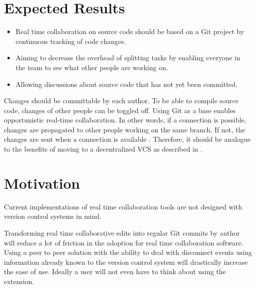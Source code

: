 \section{Expected Results}

\begin{itemize}
    \item Real time collaboration on source code should be based on a Git project by
    continuous tracking of code changes.
    \item Aiming to decrease the overhead of splitting tasks by enabling everyone in the team to see what other people are working on. 
    \item Allowing discussions about source code that has not yet been committed.
\end{itemize}

Changes should be committable by each author. To be able to compile source code, changes of other people can be toggled off.
Using Git as a base enables opportunistic real-time collaboration. In other words, if a connection is possible, changes are propagated  to other people working on the same branch. If not, the changes are sent when a connection is available \cite{6188603}. Therefore, it should be analogue to the benefits of moving to a decentralized VCS as described in \cite{AlwisSillito:2009:centralToDecentralVCS}.

\section{Motivation}

Current implementations of real time collaboration tools are not designed with version control systems in mind.

Transforming real time collaborative edits into regular Git commits by author will reduce a lot of friction in the adoption for real time collaboration software. Using a peer to peer solution with the ability to deal with disconnect events using information already known to the version control system will drastically increase the ease of use. Ideally a user will not even have to think about using the extension.